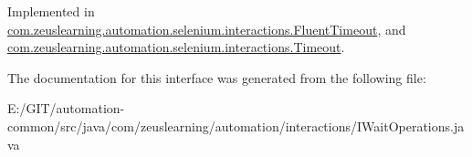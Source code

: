 Implemented in \hyperlink{classcom_1_1zeuslearning_1_1automation_1_1selenium_1_1interactions_1_1FluentTimeout_aa8a8afef31ddc1e6bcd5238005a732ec}{com.\+zeuslearning.\+automation.\+selenium.\+interactions.\+Fluent\+Timeout}, and \hyperlink{classcom_1_1zeuslearning_1_1automation_1_1selenium_1_1interactions_1_1Timeout_ac615a524a7d7d0e00de7deabae2b6d9c}{com.\+zeuslearning.\+automation.\+selenium.\+interactions.\+Timeout}.



The documentation for this interface was generated from the following file\+:\begin{DoxyCompactItemize}
\item 
E\+:/\+G\+I\+T/automation-\/common/src/java/com/zeuslearning/automation/interactions/I\+Wait\+Operations.\+java\end{DoxyCompactItemize}
